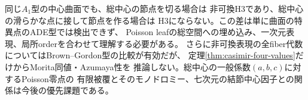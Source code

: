 \begin{remark}[同じADE型と異なる非可換正則性]
同じ$A_1$型の中心曲面でも、総中心の節点を切る場合は
非可換H3であり、総中心の滑らかな点に接して節点を作る場合は
H3にならない。この差は単に曲面の特異点のADE型では検出できず、
Poisson leafの総空間への埋め込み、一次元表現、局所orderを合わせて理解する必要がある。
さらに非可換表現の全fiber代数についてはBrown--Gordon型の比較が有効だが、
定理\ref{thm:casimir-four-values}だけからMorita同値・Azumaya性を
推論しない。総中心の一般係数$(a,b,c)$に対するPoisson零点の
有限被覆とそのモノドロミー、七次元の結節中心因子との関係は今後の優先課題である。
\end{remark}
